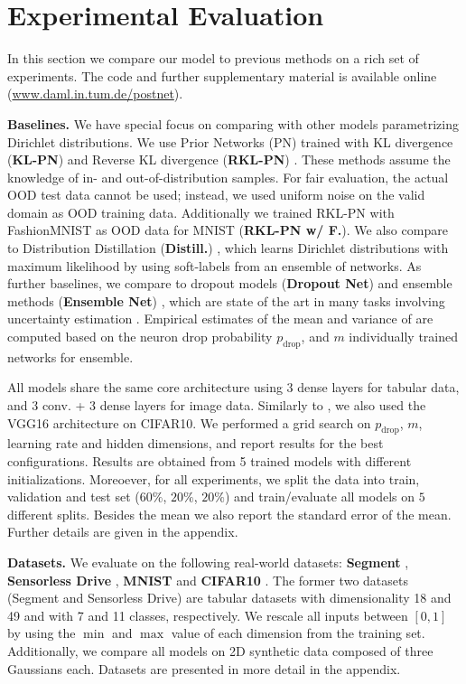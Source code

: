 \section{Experimental Evaluation}

In this section we compare our model to previous methods on a rich set of experiments. The code and further supplementary material is available online (\url{www.daml.in.tum.de/postnet}).

\textbf{Baselines.} We have special focus on comparing with other models parametrizing Dirichlet distributions. We use Prior Networks (PN) trained with KL divergence (\textbf{KL-PN}) \cite{prior_net} and Reverse KL divergence (\textbf{RKL-PN}) \cite{rev_kl_prior_net}. These methods assume the knowledge of in- and out-of-distribution samples. For fair evaluation, the actual OOD test data cannot be used; instead, we used uniform noise on the valid domain as OOD training data. Additionally we trained RKL-PN with FashionMNIST as OOD data for MNIST (\textbf{RKL-PN w/ F.}). We also compare to Distribution Distillation (\textbf{Distill.}) \cite{distribution_distillation}, which learns Dirichlet distributions with maximum likelihood by using soft-labels from an ensemble of networks. 
As further baselines, we compare to dropout models (\textbf{Dropout Net}) \cite{drop_out} and ensemble methods (\textbf{Ensemble Net}) \cite{ensemble_simple}, which are state of the art in many tasks involving uncertainty estimation \cite{uncertainty_survey}. Empirical estimates of the mean and variance of  are computed based on the neuron drop probability $p_{\text{drop}}$, and $m$ individually trained networks for ensemble.

All models share the same core architecture using 3 dense layers for tabular data, and 3 conv. + 3 dense layers for image data. Similarly to \cite{prior_net, rev_kl_prior_net}, we also used the VGG16 architecture \cite{vgg} on CIFAR10. We performed a grid search on $p_{\text{drop}}$, $m$, learning rate and hidden dimensions, and report results for the best configurations. Results are obtained from 5 trained models with different initializations.
Moreoever, for all experiments, we split the data into train, validation and test set  ($60\%$, $20\%$, $20\%$) and train/evaluate all models on $5$ different splits. Besides the mean we also report the standard error of the mean. Further details are given in the appendix.

\textbf{Datasets.} We evaluate on the following real-world datasets: \textbf{Segment} \cite{uci_datasets}, \textbf{Sensorless Drive} \cite{uci_datasets}, \textbf{MNIST} \cite{mnist} and \textbf{CIFAR10} \cite{cifar10}. The former two datasets (Segment and Sensorless Drive) are tabular datasets with %
dimensionality 18 and 49 and with 7 and 11 classes, respectively. We rescale all inputs between $[0, 1]$ by using the $\min$ and $\max$ value of each dimension from the training set. Additionally, we compare all models on 2D synthetic data composed of three Gaussians each. Datasets are presented in  more detail in the appendix.

